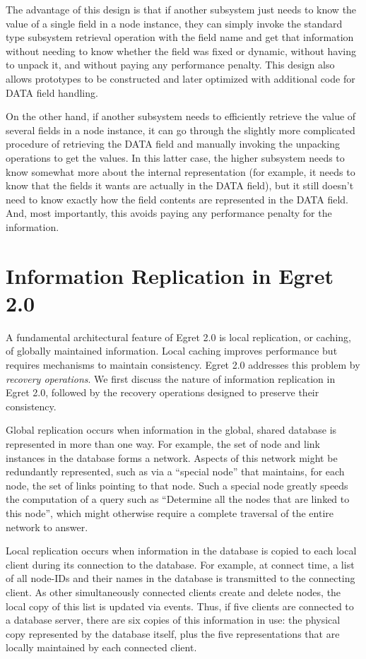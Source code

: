 The advantage of this design is that if another subsystem just needs
to know the value of a single field in a node instance, they can
simply invoke the standard type subsystem retrieval operation with
the field name and get that information without needing to know
whether the field was fixed or dynamic, without having to unpack it,
and without paying any performance penalty.  This design also allows 
prototypes to be constructed and later optimized with additional code
for DATA field handling.

On the other hand, if another subsystem needs to efficiently retrieve
the value of several fields in a node instance, it can go through the
slightly more complicated procedure of retrieving the DATA field and
manually invoking the unpacking operations to get the values.  In this
latter case, the higher subsystem needs to know somewhat more about
the internal representation (for example, it needs to know that the
fields it wants are actually in the DATA field), but it still doesn't
need to know exactly how the field contents are represented in the
DATA field.  And, most importantly, this avoids paying any performance
penalty for the information.

\section{Information Replication in Egret 2.0}

A fundamental architectural feature of Egret 2.0 is local replication,
or caching, of globally maintained information.  Local caching
improves performance but requires mechanisms to maintain consistency.
Egret 2.0 addresses this problem by {\em recovery operations}. We
first discuss the nature of information replication in Egret 2.0,
followed by the recovery operations designed to preserve their
consistency.

Global replication occurs when information in the global, shared
database is represented in more than one way.  For example, the set of
node and link instances in the database forms a network. Aspects of
this network might be redundantly represented, such as via a ``special
node'' that maintains, for each node, the set of links pointing to
that node.  Such a special node greatly speeds the computation of a
query such as ``Determine all the nodes that are linked to this
node'', which might otherwise require a complete traversal of the
entire network to answer.

Local replication occurs when information in the database is copied to
each local client during its connection to the database.  For example,
at connect time, a list of all node-IDs and their names in the
database is transmitted to the connecting client. As other
simultaneously connected clients create and delete nodes, the local
copy of this list is updated via events. Thus, if five clients are
connected to a database server, there are six copies of this information
in use: the physical copy represented by the database itself, plus the
five representations that are locally maintained by each connected
client.

